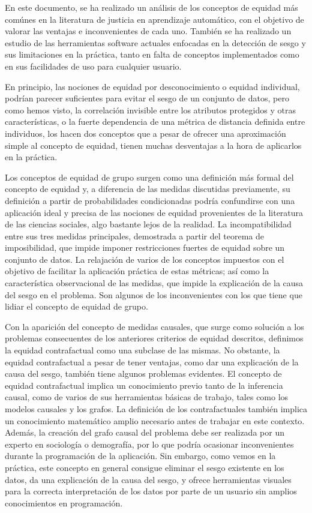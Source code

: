 \documentclass[oneside,openright,titlepage,numbers=noenddot,openany,headinclude,footinclude=true,
cleardoublepage=empty,abstractoff,BCOR=5mm,paper=a4,fontsize=12pt,main=spanish]{scrreprt}
\begin{document}
En este documento, se ha realizado un análisis de los conceptos de equidad más comúnes en la literatura de justicia en aprendizaje automático, con el objetivo de valorar las ventajas e inconvenientes de cada uno. También se ha realizado un estudio de las herramientas software actuales enfocadas en la detección de sesgo y sus limitaciones en la práctica, tanto en falta de conceptos implementados como en sus facilidades de uso para cualquier usuario.

En principio, las nociones de equidad por desconocimiento o equidad individual, podrían parecer suficientes para evitar el sesgo de un conjunto de datos, pero como hemos visto, la correlación invisible entre los atributos protegidos y otras características, o la fuerte dependencia de una métrica de distancia definida entre individuos, los hacen dos conceptos que a pesar de ofrecer una aproximación simple al concepto de equidad, tienen muchas desventajas a la hora de aplicarlos en la práctica.

Los conceptos de equidad de grupo surgen como una definición más formal del concepto de equidad y, a diferencia de las medidas discutidas previamente, su definición a partir de probabilidades condicionadas podría confundirse con una aplicación ideal y precisa de las nociones de equidad provenientes de la literatura de las ciencias sociales, algo bastante lejos de la realidad. La incompatibilidad entre sus tres medidas principales, demostrada a partir del teorema de imposibilidad, que impide imponer restricciones fuertes de equidad sobre un conjunto de datos. La relajación de varios de los conceptos impuestos con el objetivo de facilitar la aplicación práctica de estas métricas; así como la característica observacional de las medidas, que impide la explicación de la causa del sesgo en el problema. Son algunos de los inconvenientes con los que tiene que lidiar el concepto de equidad de grupo.

\clearpage

Con la aparición del concepto de medidas causales, que surge como solución a los problemas consecuentes de los anteriores criterios de equidad descritos, definimos la equidad contrafactual como una subclase de las mismas. No obstante, la equidad contrafactual a pesar de tener ventajas, como dar una explicación de la causa del sesgo, también tiene algunos problemas evidentes. El concepto de equidad contrafactual implica un conocimiento previo tanto de la inferencia causal, como de varios de sus herramientas básicas de trabajo, tales como los modelos causales y los grafos. La definición de los contrafactuales también implica un conocimiento matemático amplio necesario antes de trabajar en este contexto. Además, la creación del grafo causal del problema debe ser realizada por un experto en sociología o demografía, por lo que podría ocasionar inconvenientes durante la programación de la aplicación. Sin embargo, como vemos en la práctica, este concepto en general consigue eliminar el sesgo existente en los datos, da una explicación de la causa del sesgo, y ofrece herramientas visuales para la correcta interpretación de los datos por parte de un usuario sin amplios conocimientos en programación.
\end{document}
